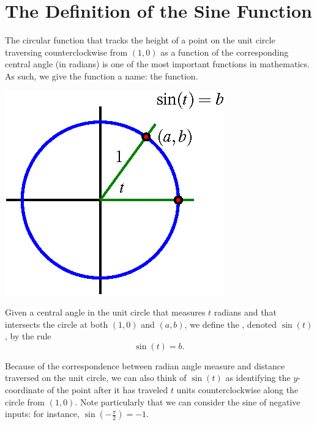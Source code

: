 \documentclass[nooutcomes]{ximera}
\begin{document}

\section{The Definition of the Sine Function}

The circular function that tracks the height of a point on the unit circle traversing counterclockwise from \((1,0)\) as a function of the corresponding central angle (in radians) is one of the most important functions in mathematics.  As such, we give the function a name:  the  function.%

\begin{definition}
\begin{image}
\includegraphics{sine-defn.png}
\end{image}
Given a central angle in the unit circle that measures \(t\) radians and that intersects the circle at both \((1,0)\) and \((a,b)\), we define the , denoted \(\sin(t)\), by the rule
\begin{equation*}
\sin(t) = b\text{.}
\end{equation*}
\end{definition}

Because of the correspondence between radian angle measure and distance traversed on the unit circle, we can also think of \(\sin(t)\) as identifying the \(y\)-coordinate of the point after it has traveled \(t\) units counterclockwise along the circle from \((1,0)\).  Note particularly that we can consider the sine of negative inputs:  for instance, \(\sin(-\frac{\pi}{2}) = -1\).
\end{document}
